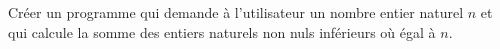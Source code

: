 
Créer un programme qui demande à l'utilisateur un nombre entier naturel $n$ et qui calcule la somme des entiers naturels non nuls inférieurs où égal à $n$. 